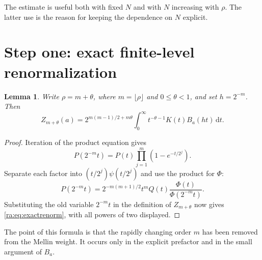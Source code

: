 \documentclass[11pt,a4paper,oneside,openany]{book}
\numberwithin{equation}{chapter}
\newtheorem{lemma}[theorem]{Lemma}
\theoremstyle{definition}
\theoremstyle{remark}
\newcommand{\dd}{\,\mathrm d}
\newcommand{\W}{K}
\begin{document}
The estimate is useful both with fixed $N$ and with $N$ increasing with
$\rho$. The latter use is the reason for keeping the dependence on $N$
explicit.

\section{Step one: exact finite-level renormalization}
\begin{lemma}\label{ra:lem:finitelevel}
Write $\rho=m+\theta$, where $m=\lfloor\rho\rfloor$ and $0\le\theta<1$,
and set $h=2^{-m}$. Then
\begin{equation}\label{ra:eq:exactrenorm}
 Z_{m+\theta}(a)
 =2^{m(m-1)/2+m\theta}
   \int_0^\infty t^{-\theta-1}\W(t)B_a(ht)\dd t.
\end{equation}
\end{lemma}
\begin{proof}
Iteration of the product equation gives
\[
 P(2^{-m}t)=P(t)\prod_{j=1}^m(1-e^{-t/2^j}).
\]
Separate each factor into $(t/2^j)\psi(t/2^j)$ and use the product for $\Phi$:
\begin{equation}\label{ra:eq:Qfinitelevel}
 P(2^{-m}t)=2^{-m(m+1)/2}t^mQ(t)\frac{\Phi(t)}{\Phi(2^{-m}t)}.
\end{equation}
Substituting the old variable $2^{-m}t$ in the definition of $Z_{m+\theta}$
now gives \eqref{ra:eq:exactrenorm}, with all powers of two displayed.
\end{proof}

The point of this formula is that the rapidly changing order $m$ has been
removed from the Mellin weight. It occurs only in the explicit prefactor
and in the small argument of $B_a$.
\end{document}
